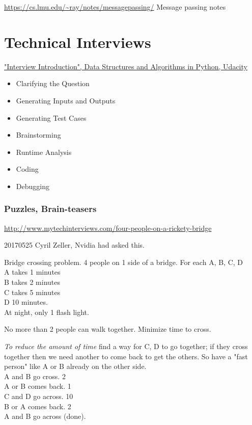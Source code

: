 \documentclass[10pt]{amsart}
\begin{document}
\begin{multicols*}{2}
\url{https://cs.lmu.edu/~ray/notes/messagepassing/} Message passing notes
	
\part{Technical Interviews}

\href{https://classroom.udacity.com/courses/ud513/lessons/7707710408/concepts/77114606610923}{"Interview Introduction", Data Structures and Algorithms in Python, Udacity}

\begin{itemize}
	\item Clarifying the Question
	\item Generating Inputs and Outputs
	\item Generating Test Cases
	\item Brainstorming
	\item Runtime Analysis
	\item Coding
	\item Debugging
\end{itemize}

\section{Puzzles, Brain-teasers}

\url{http://www.mytechinterviews.com/four-people-on-a-rickety-bridge}

20170525 Cyril Zeller, Nvidia had asked this.

Bridge crossing problem. 4 people on 1 side of a bridge. For each A, B, C, D \\
A takes 1 minutes \\
B takes 2 minutes \\
C takes 5 minutes \\
D 10 minutes. \\

At night, only 1 flash light.

No more than 2 people can walk together. Minimize time to cross.

\emph{To reduce the amount of time} find a way for C, D to go together; if they cross together then we need another to come back to get the others. So have a "fast person" like A or B already on the other side. \\

A and B go cross. 2 \\
A or B comes back. 1 \\
C and D go across. 10 \\
B or A comes back. 2 \\
A and B go across (done). \\


\end{multicols*}
\end{document}
